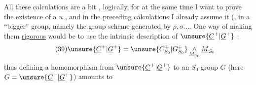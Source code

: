 All these calculations are a bit , logically, for at the same time I want to prove
the existence of a  $u$ ,
and in the preceding calculations I already assume it (, in a
``bigger'' group, namely the  group scheme 
generated by $\rho,\sigma\ldots$.
One way of making them \uline{rigorous} would be to use the intrinsic description of
$\unsure{\underline C^{+}|\underline G^{+}}$ :
\[
\tag{39}
\unsure{\underline C^{+}|\underline G^{+}}
=\unsure{C^{+}_{S_0}|G^{+}_{S_0}}
 \mathop{\wedge}_{M_{S_0}}\underline M_{S_0}
\]
thus defining a homomorphism from
$\unsure{\underline C^{+}|\underline G^{+}}$ to an $S_0$-group $G$
(here $G=\unsure{\underline C^{+}|\underline G^{+}}$) amounts to
